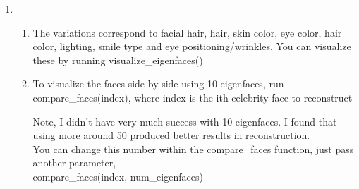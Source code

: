 \documentclass[11pt]{article}
\begin{document}
\begin{enumerate}
\item
\begin{enumerate}
\item
The variations correspond to facial hair, hair, skin color, eye color, hair color, lighting, smile type and eye positioning/wrinkles. You can visualize these by running visualize\_eigenfaces()
\item
To visualize the faces side by side using 10 eigenfaces, run
compare\_faces(index), where index is the ith celebrity face to reconstruct

Note, I didn't have very much success with 10 eigenfaces. I found that using more around 50 produced better results in reconstruction.\\
You can change this number within the compare\_faces function, just pass another parameter,\\
compare\_faces(index, num\_eigenfaces)
\end{enumerate}
\end{enumerate}
\end{document}
